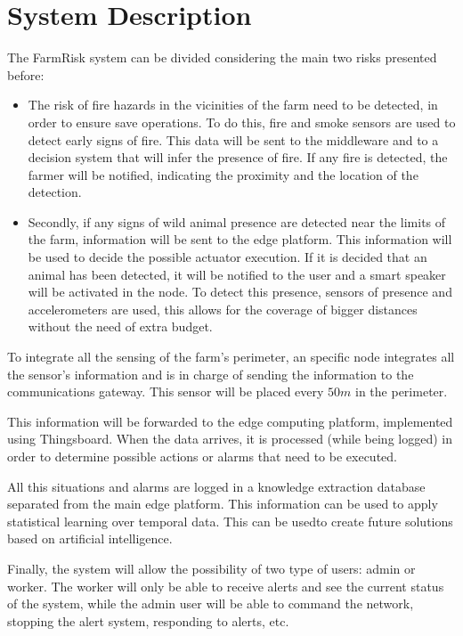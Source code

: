 \section{System Description}

The FarmRisk system can be divided considering the main two risks presented before:

\begin{itemize}
    \item The risk of fire hazards in the vicinities of the farm need to be detected, in order to ensure save operations. To do this, fire and smoke sensors are used to detect early signs of fire. This data will be 
    sent to the middleware and to a decision system that will infer the presence of fire. If any fire is detected, the farmer will be notified, indicating the proximity and the location of 
    the detection.
    \item Secondly, if any signs of wild animal presence are detected near the limits of the farm, information will be sent to the edge platform. This information will be used to decide the possible actuator execution. 
    If it is decided that an animal has been detected, it will be notified to the user and a smart speaker will be activated in the node. To detect this presence, sensors of presence and accelerometers are used, this allows for the coverage of bigger distances without the 
    need of extra budget.
\end{itemize}

To integrate all the sensing of the farm's perimeter, an specific node integrates all the sensor's information and is in charge of sending the information to the communications gateway. This sensor will be placed every $50m$ in the perimeter.

This information will be forwarded to the edge computing platform, implemented using Thingsboard. When the data arrives, it is processed (while being logged) in order to determine possible actions or alarms that need to be 
executed.

All this situations and alarms are logged in a knowledge extraction database separated from the main edge platform. This information can be used to apply statistical learning over temporal data. 
This can be usedto create future solutions based on artificial intelligence.

Finally, the system will allow the possibility of two type of users: admin or worker. The worker will only be able to receive alerts and see the current status of the system, while the admin user will be able to command the 
network, stopping the alert system, responding to alerts, etc.


